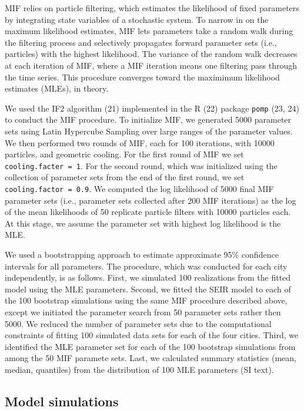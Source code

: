 \documentclass[3p]{elsarticle} %
\begin{document}
MIF relies on particle filtering, which estimates the likelihood of
fixed parameters by integrating state variables of a stochastic system.
To narrow in on the maximum likelihood estimates, MIF lets parameters
take a random walk during the filtering process and selectively
propagates forward parameter sets (i.e., particles) with the highest
likelihood. The variance of the random walk decreases at each iteration
of MIF, where a MIF iteration means one filtering pass through the time
series. This procedure converges toward the maximimum likelihood
estimates (MLEs), in theory.

We used the IF2 algorithm (21) implemented in the R (22) package
\texttt{pomp} (23, 24) to conduct the MIF procedure. To initialize MIF,
we generated 5000 parameter sets using Latin Hypercube Sampling over
large ranges of the parameter values. We then performed two rounds of
MIF, each for 100 iterations, with 10000 particles, and geometric
cooling. For the first round of MIF we set
\texttt{cooling.facter\ =\ 1}. For the second round, which was
initialized using the collection of parameter sets from the end of the
first round, we set \texttt{cooling.factor\ =\ 0.9}. We computed the log
likelihood of 5000 final MIF parameter sets (i.e., parameter sets
collected after 200 MIF iterations) as the log of the mean likelihoods
of 50 replicate particle filters with 10000 particles each. At this
stage, we assume the parameter set with highest log likelihood is the
MLE.

We used a bootstrapping approach to estimate approximate 95\% confidence
intervals for all parameters. The procedure, which was conducted for
each city independently, is as follows. First, we simulated 100
realizations from the fitted model using the MLE parameters. Second, we
fitted the SEIR model to each of the 100 bootstrap simulations using the
same MIF procedure described above, except we initiated the parameter
search from 50 parameter sets rather then 5000. We reduced the number of
parameter sets due to the computational constraints of fitting 100
simulated data sets for each of the four cities. Third, we identified
the MLE parameter set for each of the 100 bootstrap simulations from
among the 50 MIF paramete sets. Last, we calculated summary statistics
(mean, median, quantiles) from the distribution of 100 MLE parameters
(SI text).

\subsection{Model simulations}\label{model-simulations}
\end{document}
